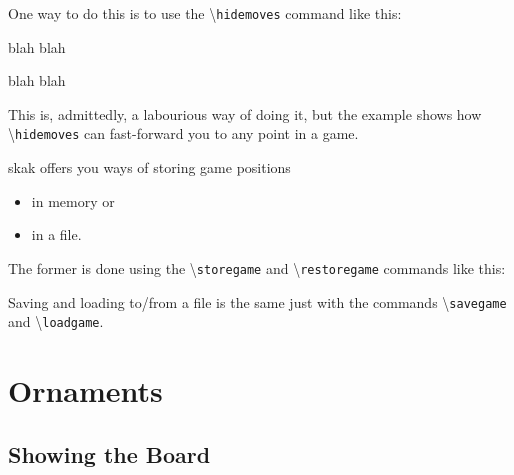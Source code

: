 \documentclass[10pt]{article}
\makeatletter
\renewcommand\showboard{\print@board}
\let\ORIshowboard\showboard
\renewcommand\showboard{%
    \makebox[8\squarelength]{%
    \rule{0pt}{9\squarelength}%
    \begin{postscript}%
    [trim = \squarelength{} 0pt \squarelength{} 0pt]
    \ORIshowboard
    \end{postscript}}}
\newcommand{\package}[1]{\textsf{#1}}
\newcommand{\command}[1]{\textbackslash\texttt{#1}}
\makeatother
\begin{document}
One way to do this is to use the \command{hidemoves} command like
this:

\begin{LTXexample}
\newgame
{}

\showboard
\end{LTXexample}

\begin{LTXexample}
 blah blah

\showboard

\end{LTXexample}

\begin{LTXexample}
\newgame
{}
 blah blah

\showboard
\end{LTXexample}

This is, admittedly, a labourious way of doing it, but the example
shows how \command{hidemoves} can fast-forward you to any point in a game.


\package{skak} offers you ways of storing game positions
\begin{itemize}
\item in memory or
\item in a file.
\end{itemize}

The former is done using the \command{storegame} and
\command{restoregame} commands like this:

\begin{LTXexample}
\newgame
{}

\showboard
{}

\showboard
\end{LTXexample}


Saving and loading to/from a file is the same just with the commands
\command{savegame} and \command{loadgame}.


\section{Ornaments}
\label{sec:ornaments}



\subsection{Showing the Board}
\label{sec:showing-board}
\end{document}
